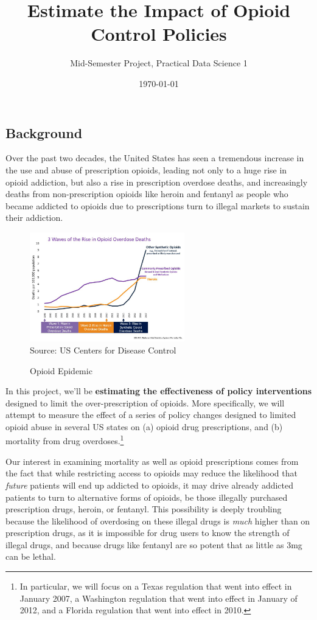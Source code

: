 \documentclass[12pt]{article}
\title{Estimate the Impact of Opioid Control Policies}
\author{Mid-Semester Project, Practical Data Science 1}
\date{\today}
\begin{document}
\maketitle

\subsection*{Background}

Over the past two decades, the United States has seen a tremendous increase in the use and abuse of prescription opioids, leading not only to a huge rise in opioid addiction, but also a rise in prescription overdose deaths, and increasingly deaths from non-prescription opioids like heroin and fentanyl as people who became addicted to opioids due to prescriptions turn to illegal markets to sustain their addiction.

\begin{figure}[h!]
  \centering
  \caption{Opioid Epidemic}\label{}
  \includegraphics[width=0.6\textwidth]{images/cdc_opioid_stats.png}\\
  \scriptsize{Source: US Centers for Disease Control}
\end{figure}

In this project, we'll be \textbf{estimating the effectiveness of policy interventions} designed to limit the over-prescription of opioids. More specifically, we will attempt to measure the effect of a series of policy changes designed to limited opioid abuse in several US states on (a) opioid drug prescriptions, and (b) mortality from drug overdoses.\footnote{ In particular, we will focus on a Texas regulation that went into effect in January 2007, a Washington regulation that went into effect in January of 2012, and a Florida regulation that went into effect in 2010.}

Our interest in examining mortality as well as opioid prescriptions comes from the fact that while restricting access to opioids may reduce the likelihood that \emph{future} patients will end up addicted to opioids, it may drive already addicted patients to turn to alternative forms of opioids, be those illegally purchased prescription drugs, heroin, or fentanyl. This possibility is deeply troubling because the likelihood of overdosing on these illegal drugs is \emph{much} higher than on prescription drugs, as it is impossible for drug users to know the strength of illegal drugs, and because drugs like fentanyl are so potent that as little as 3mg can be lethal.
\end{document}
